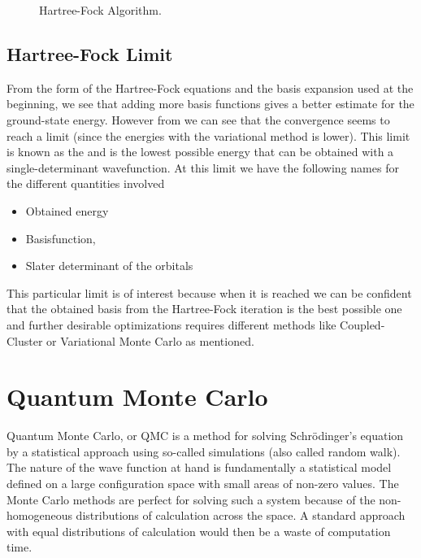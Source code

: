 \begin{figure}[H]
            \caption{Hartree-Fock Algorithm.}
        \end{figure}

\subsection{Hartree-Fock Limit\label{susec:HFL}}
    From the form of the Hartree-Fock equations and the basis expansion used at
    the beginning, we see that adding more basis functions gives a better
    estimate for the ground-state energy. However from  we can
    see that the convergence seems to reach a limit (since the energies with
    the variational method is lower). This limit is known as the
     \cite{HFlimit} and is the lowest possible energy
    that can be obtained with a single-determinant wavefunction. At this limit
    we have the following names for the different quantities involved
        \begin{itemize}
            \item{ Obtained energy}
            \item{ Basisfunction, }
            \item{ Slater determinant of the orbitals}
        \end{itemize}
    This particular limit is of interest because when it is reached we can be
    confident that the obtained basis from the Hartree-Fock iteration is the
    best possible one and further desirable optimizations requires different
    methods like Coupled-Cluster or Variational Monte Carlo as mentioned.


\section{Quantum Monte Carlo\label{sec:QMC}}
    Quantum Monte Carlo, or QMC is a method for solving Schrödinger's equation
    by a statistical approach using so-called  simulations
    (also called random walk). The nature of the wave function at hand is
    fundamentally a statistical model defined on a large configuration space
    with small areas of non-zero values. The Monte Carlo methods are perfect for
    solving such a system because of the non-homogeneous distributions of
    calculation across the space. A standard approach with equal distributions
    of calculation would then be a waste of computation time. 


